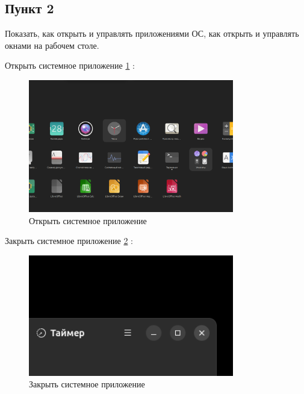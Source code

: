 \subsection{Пункт 2}

Показать, как открыть и управлять приложениями ОС, как открыть и управлять окнами на рабочем столе.


Открыть системное приложение \ref{fig:openApp} :

\begin{figure}[!h]
    \centering
    \includegraphics[width = 0.8\textwidth]{images/openApp.png}
    
    \caption{Открыть системное приложение}
    
    \label{fig:openApp}
\end{figure}

\newpage

Закрыть системное приложение \ref{fig:closeApp} :

\begin{figure}[!h]
    \centering
    \includegraphics[width = 0.8\textwidth]{images/closeApp.png}
    
    \caption{Закрыть системное приложение}
    
    \label{fig:closeApp}
\end{figure}

